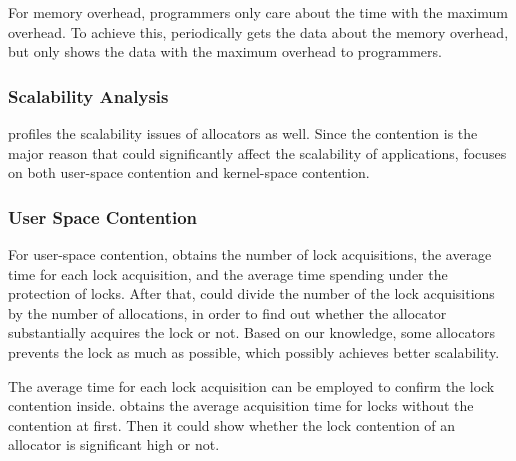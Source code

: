  



For memory overhead, programmers only care about the time with the maximum overhead. To achieve this, \MP{} periodically gets the data about the memory overhead, but only shows the data with the maximum overhead to programmers.  
 

\subsubsection{Scalability Analysis} 

\MP{} profiles the scalability issues of allocators as well. Since the contention is the major reason that could significantly affect the scalability of applications, \MP{} focuses on both user-space contention and kernel-space contention. 

\subsubsection{User Space Contention}
For user-space contention, \MP{} obtains the number of lock acquisitions, the average time for each lock acquisition, and the average time spending under the protection of locks. After that, \MP{} could divide the number of the lock acquisitions by the number of allocations, in order to find out whether the allocator substantially acquires the lock or not. Based on our knowledge, some allocators prevents the lock as much as possible, which possibly achieves better scalability. 

The average time for each lock acquisition can be employed to confirm the lock contention inside. \MP{} obtains the average acquisition time for locks without the contention at first. Then it could show whether the lock contention of an allocator is significant high or not.

